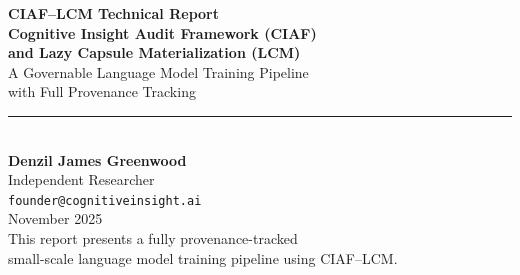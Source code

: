 \documentclass[11pt,a4paper]{article}
\begin{document}
\begin{titlepage}
    \centering
    
    {\large \textbf{CIAF--LCM Technical Report}}\\[1.5cm]
    
    {\Huge \bfseries Cognitive Insight Audit Framework (CIAF)\\[0.3cm]
    and Lazy Capsule Materialization (LCM)}\\[0.8cm]
    
    {\Large A Governable Language Model Training Pipeline\\
    with Full Provenance Tracking}\\[1.5cm]
    
    \rule{0.6\textwidth}{0.4pt}\\[1.5cm]
    
    {\Large \textbf{Denzil James Greenwood}}\\[0.2cm]
    {\large Independent Researcher}\\[0.2cm]
    {\large \texttt{founder@cognitiveinsight.ai}}\\[2cm]
    
    {\large November 2025}\\[2cm]
    
    {\small This report presents a fully provenance-tracked\\
    small-scale language model training pipeline using CIAF--LCM.}
    
\end{titlepage}

\newpage
\end{document}
